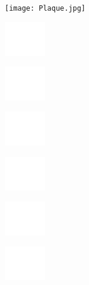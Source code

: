 \documentclass{article}
\begin{document}
\pagestyle{empty}
\centering

\texttt{[image: Plaque.jpg]}
\par
\textbf{}
\vspace{1cm}

\includegraphics[width=18mm]{Blank.jpg}
\par
\textbf{}
\vspace{1cm}

\includegraphics[width=18mm]{Blank.jpg}
\par
\textbf{}
\vspace{1cm}

\includegraphics[width=18mm]{Blank.jpg}
\par
\textbf{}
\vspace{1cm}

\includegraphics[width=18mm]{Blank.jpg}
\par
\textbf{}
\vspace{1cm}

\includegraphics[width=18mm]{Blank.jpg}
\par
\textbf{}
\vspace{1cm}

\includegraphics[width=18mm]{Blank.jpg}
\par
\textbf{}
\vspace{1cm}
\end{document}
